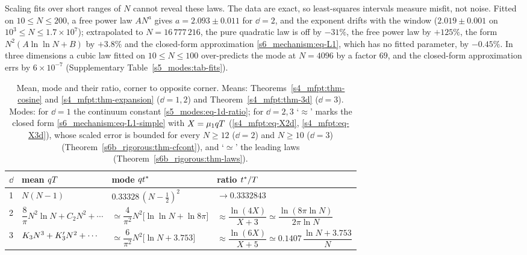 Scaling fits over short ranges of $N$ cannot reveal these laws. The data are exact, so least-squares intervals
measure misfit, not noise. Fitted on $10\le N\le200$, a free power law $AN^{a}$ gives $a=2.093\pm0.011$ for $\dd=2$,
and the exponent drifts with the window ($2.019\pm0.001$ on $10^{3}\le N\le1.7\times10^{7}$); extrapolated to
$N=16\,777\,216$, the pure quadratic law is off by $-31\%$, the free power law by $+125\%$, the form
$N^{2}(A\ln\ln N+B)$ by $+3.8\%$ and the closed-form approximation \eqref{s6_mechanism:eq-L1}, which has no fitted
parameter, by $-0.45\%$. In three dimensions a cubic law fitted on $10\le N\le100$ over-predicts the mode at $N=4096$ by a
factor $69$, and the closed-form approximation errs by $6\times10^{-7}$ (Supplementary Table~\ref{s5_modes:tab-fits}).

\begin{table}[tbp]
\centering
\caption{Mean, mode and their ratio, corner to opposite corner. Means: Theorems~\ref{s4_mfpt:thm-cosine} and
\ref{s4_mfpt:thm-expansion} ($\dd=1,2$) and Theorem~\ref{s4_mfpt:thm-3d} ($\dd=3$). Modes: for $\dd=1$ the continuum
constant \eqref{s5_modes:eq-1d-ratio}; for $\dd=2,3$ `$\approx$' marks the closed form \eqref{s6_mechanism:eq-L1-simple}
with $X=\mu_{1} qT$ (\eqref{s4_mfpt:eq-X2d}, \eqref{s4_mfpt:eq-X3d}), whose scaled error is bounded for every $N\ge12$
($\dd=2$) and $N\ge10$ ($\dd=3$) (Theorem~\ref{s6b_rigorous:thm-cfcont}), and `$\simeq$' the leading laws
(Theorem~\ref{s6b_rigorous:thm-laws}).}
\label{s5_modes:tab-laws}
\small
\begin{tabular}{@{}clll@{}}
\toprule
$\dd$ & mean $qT$ & mode $qt^{*}$ & ratio $t^{*}/T$\\
\midrule
1 & $N(N-1)$ & $0.33328\,(N-\tfrac12)^{2}$ & $\to0.3332843$\\[5pt]
2 & $\dfrac8\pi N^{2}\ln N+C_{2}N^{2}+\cdots$ &
    $\simeq\dfrac{4}{\pi^{2}}N^{2}\bigl[\ln\ln N+\ln8\pi\bigr]$ &
    $\approx\dfrac{\ln(4X)}{X+3}\simeq\dfrac{\ln(8\pi\ln N)}{2\pi\ln N}$\\[9pt]
3 & $K_{3} N^{3}+K_{3}' N^{2}+\cdots$ &
    $\simeq\dfrac{6}{\pi^{2}}N^{2}\bigl[\ln N+3.753\bigr]$ &
    $\approx\dfrac{\ln(6X)}{X+5}\simeq0.1407\,\dfrac{\ln N+3.753}{N}$\\
\bottomrule
\end{tabular}
\end{table}
